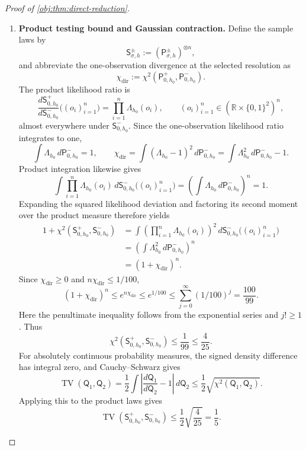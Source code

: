 \documentclass[11pt]{article}
\begin{document}
\begin{proof}[Proof of \cref{obj:thm:direct-reduction}]
\begin{enumerate}
\item \textbf{Product testing bound and Gaussian contraction.}
Define the sample laws by
\[
\mathsf S_{\sigma,h}^{\pm}
:=(\mathsf P_{\sigma,h}^{\pm})^{\otimes n},
\]
and abbreviate the one-observation divergence at the selected resolution as
\[
\chi_{\mathrm{dir}}
:=\chi^2(\mathsf P_{0,h_0}^+,\mathsf P_{0,h_0}^-).
\]
The product likelihood ratio is
\[
\frac{d\mathsf S_{0,h_0}^+}{d\mathsf S_{0,h_0}^-}
\bigl((o_i)_{i=1}^n\bigr)
=\prod_{i=1}^n\Lambda_{h_0}(o_i),
\qquad
(o_i)_{i=1}^n\in(\mathbb R\times\{0,1\}^2)^n,
\]
almost everywhere under \(\mathsf S_{0,h_0}^-\). Since the one-observation likelihood ratio integrates to one,
\[
\int\Lambda_{h_0}\,d\mathsf P_{0,h_0}^-=1,
\qquad
\chi_{\mathrm{dir}}
=\int(\Lambda_{h_0}-1)^2\,d\mathsf P_{0,h_0}^-
=\int\Lambda_{h_0}^2\,d\mathsf P_{0,h_0}^- -1.
\]
Product integration likewise gives
\[
\int\prod_{i=1}^n\Lambda_{h_0}(o_i)
\,d\mathsf S_{0,h_0}^-\bigl((o_i)_{i=1}^n\bigr)
=\left(\int\Lambda_{h_0}\,d\mathsf P_{0,h_0}^-\right)^n
=1.
\]
Expanding the squared likelihood deviation and factoring its second moment over the product measure therefore yields
\[
\begin{aligned}
1+\chi^2(\mathsf S_{0,h_0}^+,\mathsf S_{0,h_0}^-)
&=\int\left(\prod_{i=1}^n\Lambda_{h_0}(o_i)\right)^2
\,d\mathsf S_{0,h_0}^-\bigl((o_i)_{i=1}^n\bigr)\\
&=\left(\int\Lambda_{h_0}^2\,d\mathsf P_{0,h_0}^-\right)^n\\
&=(1+\chi_{\mathrm{dir}})^n.
\end{aligned}
\]
Since \(\chi_{\mathrm{dir}}\ge0\) and \(n\chi_{\mathrm{dir}}\le1/100\),
\[
(1+\chi_{\mathrm{dir}})^n
\le e^{n\chi_{\mathrm{dir}}}
\le e^{1/100}
\le\sum_{j=0}^\infty(1/100)^j
=\frac{100}{99}.
\]
Here the penultimate inequality follows from the exponential series and \(j!\ge1\). Thus
\[
\chi^2(\mathsf S_{0,h_0}^+,\mathsf S_{0,h_0}^-)
\le\frac1{99}\le\frac4{25}.
\]
For absolutely continuous probability measures, the signed density difference has integral zero, and Cauchy--Schwarz gives
\[
\operatorname{TV}(\mathsf Q_1,\mathsf Q_2)
=\frac12\int
\left|\frac{d\mathsf Q_1}{d\mathsf Q_2}-1\right|
\,d\mathsf Q_2
\le\frac12\sqrt{\chi^2(\mathsf Q_1,\mathsf Q_2)}.
\]
Applying this to the product laws gives
\[
\operatorname{TV}(\mathsf S_{0,h_0}^+,\mathsf S_{0,h_0}^-)
\le\frac12\sqrt{\frac4{25}}=\frac15.
\]


\end{enumerate}
\end{proof}
\end{document}
